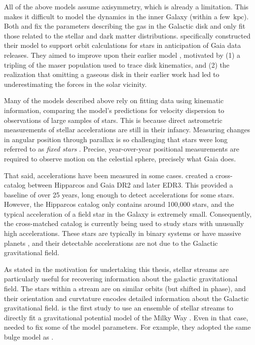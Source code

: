         All of the above models assume axisymmetry, which is already a limitation. This makes it difficult to model the dynamics in the inner Galaxy (within a few~$\mathrm{kpc}$). Both \citet{2017MNRAS.465...76M} and \citet{2024MNRAS.527.1915B} fix the parameters describing the gas in the Galactic disk and only fit those related to the stellar and dark matter distributions. \citet{2017MNRAS.465...76M} specifically constructed their model to support orbit calculations for stars in anticipation of Gaia data releases. They aimed to improve upon their earlier model \citep{2011MNRAS.414.2446M}, motivated by (1) a tripling of the maser population used to trace disk kinematics, and (2) the realization that omitting a gaseous disk in their earlier work had led to underestimating the forces in the solar vicinity.

        Many of the models described above rely on fitting data using kinematic information, comparing the model's predictions for velocity dispersion to observations of large samples of stars. This is because direct astrometric measurements of stellar accelerations are still in their infancy. Measuring changes in angular position through parallax is so challenging that stars were long referred to as \textit{fixed stars} \citep{1981unht.book.....K}. Precise, year-over-year positional measurements are required to observe motion on the celestial sphere, precisely what Gaia does.

        That said, accelerations have been measured in some cases. \citet{2018ApJS..239...31B,2021ApJS..254...42B} created a cross-catalog between Hipparcos and Gaia DR2 \citep{2018A&A...616A...1G} and later EDR3. This provided a baseline of over 25 years, long enough to detect accelerations for some stars. However, the Hipparcos catalog only contains around 100,000 stars, and the typical acceleration of a field star in the Galaxy is extremely small. Consequently, the cross-matched catalog is currently being used to study stars with unusually high accelerations. These stars are typically in binary systems or have massive planets \citep{2023MNRAS.521.5232W,2025AJ....170...52G}, and their detectable accelerations are not due to the Galactic gravitational field.

        As stated in the motivation for undertaking this thesis, stellar streams are particularly useful for recovering information about the galactic gravitational field. The stars within a stream are on similar orbits (but shifted in phase), and their orientation and curvtature encodes detailed information about the Galactic gravitational field. \citet{2024ApJ...967...89I} is the first study to use an ensemble of stellar streams to directly fit a gravitational potential model of the Milky Way \citep[see also][who also used streams to infer galactic potential parameters]{2010AAS...21532103L,2016ApJ...833...31B}. Even in that case, \citet{2024ApJ...967...89I} needed to fix some of the model parameters. For example, they adopted the same bulge model as \citet{2017MNRAS.465...76M}.

